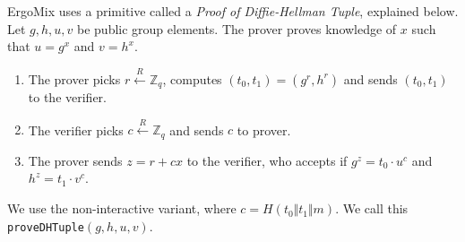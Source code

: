 \documentclass[11pt]{article}
\newcommand{\mixname}{ErgoMix\xspace}
\begin{document}
\mixname uses a primitive called a {\em Proof of Diffie-Hellman Tuple}, explained below. Let $g, h, u, v$ be public group elements. The prover proves knowledge of $x$ such that $u={g}^x$ and $v={h}^x$. 
\begin{enumerate}
	\item The prover picks $r \stackrel{R}{\leftarrow} \mathbb{Z}_q$, computes $(t_0, t_1) = ({g}^r, {h}^r)$ and sends $(t_0, t_1)$ to the verifier.
	\item The verifier picks $c \stackrel{R}{\leftarrow} \mathbb{Z}_q$ and sends $c$ to prover.
	\item The prover sends $z = r + cx$ to the verifier, who accepts if ${g}^z = {t_0}\cdot {u}^c$ and $h^z=t_1\cdot v^c$. %
\end{enumerate}
We use the non-interactive variant, where $c = H(t_0 \Vert t_1\Vert m)$. We call this \texttt{proveDHTuple}$(g, h, u, v)$.
\end{document}
